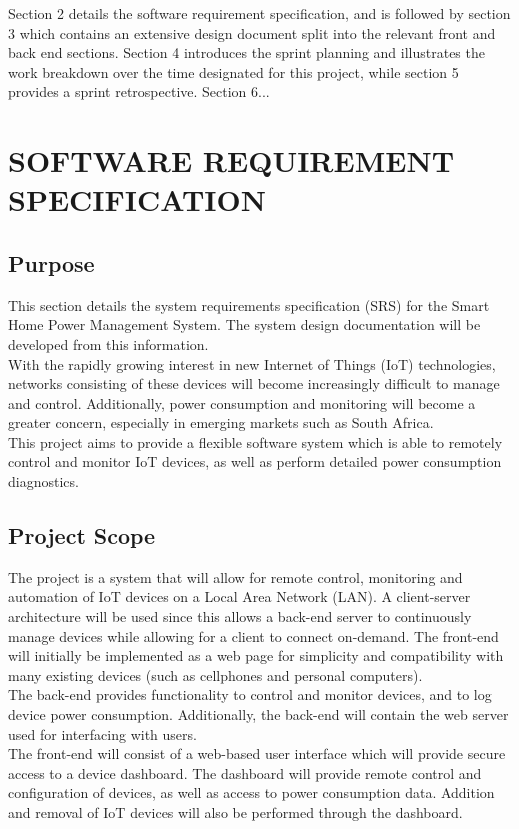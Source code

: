 \documentclass[10pt,twocolumn]{witseiepaper}
\begin{document}
	Section 2 details the software requirement specification, and is followed by section 3 which contains an extensive design document split into the relevant front and back end sections. Section 4 introduces the sprint planning and illustrates the work breakdown over the time designated for this project, while section 5 provides a sprint retrospective. Section 6...
	\section{SOFTWARE REQUIREMENT SPECIFICATION}
	
	\subsection{Purpose}
	This section details the system requirements specification (SRS) for the Smart Home Power Management System. The system design documentation will be developed from this information.\\
	\newline 
	With the rapidly growing interest in new Internet of Things (IoT) technologies, networks consisting of these devices will become increasingly difficult to manage and control. Additionally, power consumption and monitoring will become a greater concern, especially in emerging markets such as South Africa.\\
	\newline 
	This project aims to provide a flexible software system which is able to remotely control and monitor IoT devices, as well as perform detailed power consumption diagnostics.
	
	\subsection{Project Scope}
	The project is a system that will allow for remote control, monitoring and automation of IoT devices on a Local Area Network (LAN). A client-server architecture will be used since this allows a back-end server to continuously manage devices while allowing for a client to connect on-demand. The front-end will initially be implemented as a web page for simplicity and compatibility with many existing devices (such as cellphones and personal computers). \\
	\newline 
	The back-end provides functionality to control and monitor devices, and to log device power consumption. Additionally, the back-end will contain the web server used for interfacing with users. \\
	\newline
	The front-end will consist of a web-based user interface which will provide secure access to a device dashboard. The dashboard will provide remote control and configuration of devices, as well as access to power consumption data. Addition and removal of IoT devices will also be performed through the dashboard. 
	
\end{document}
